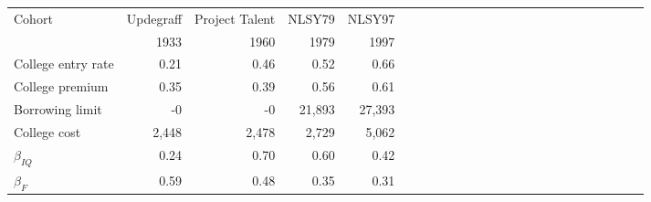 \begin{tabular}{lrrrrrrrrrrrrrrrrrrrrrrr}
\hline
Cohort & Updegraff  & Project Talent  & NLSY79  & NLSY97  &   &   &   &   &   &   &   &   &   &   &   &   &   &   &   &   &   &   &   \\ 
  & 1933  & 1960  & 1979  & 1997  &   &   &   &   &   &   &   &   &   &   &   &   &   &   &   &   &   &   &   \\ 
\hline
College entry rate & 0.21  & 0.46  & 0.52  & 0.66  &   &   &   &   &   &   &   &   &   &   &   &   &   &   &   &   &   &   &   \\ 
College premium & 0.35  & 0.39  & 0.56  & 0.61  &   &   &   &   &   &   &   &   &   &   &   &   &   &   &   &   &   &   &   \\ 
Borrowing limit & -0  & -0  & 21,893  & 27,393  &   &   &   &   &   &   &   &   &   &   &   &   &   &   &   &   &   &   &   \\ 
College cost & 2,448  & 2,478  & 2,729  & 5,062  &   &   &   &   &   &   &   &   &   &   &   &   &   &   &   &   &   &   &   \\ 
\hline
$\beta_{IQ}$ & 0.24  & 0.70  & 0.60  & 0.42  &   &   &   &   &   &   &   &   &   &   &   &   &   &   &   &   &   &   &   \\ 
$\beta_{F}$ & 0.59  & 0.48  & 0.35  & 0.31  &   &   &   &   &   &   &   &   &   &   &   &   &   &   &   &   &   &   &   \\ 
\hline
\end{tabular}%
